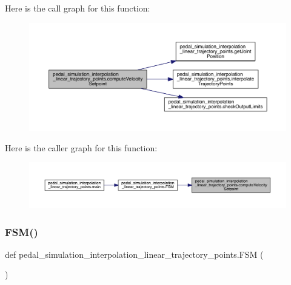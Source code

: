 Here is the call graph for this function\+:\nopagebreak
\begin{figure}[H]
\begin{center}
\leavevmode
\includegraphics[width=350pt]{namespacepedal__simulation__interpolation__linear__trajectory__points_acd7eb1865e5d89c44a0a4e799df6ff8f_cgraph}
\end{center}
\end{figure}
Here is the caller graph for this function\+:\nopagebreak
\begin{figure}[H]
\begin{center}
\leavevmode
\includegraphics[width=350pt]{namespacepedal__simulation__interpolation__linear__trajectory__points_acd7eb1865e5d89c44a0a4e799df6ff8f_icgraph}
\end{center}
\end{figure}
\mbox{\label{namespacepedal__simulation__interpolation__linear__trajectory__points_aa9b9e1956f51882e5f93d5f2bc0fd29b}} 
\subsubsection{\texorpdfstring{FSM()}{FSM()}}
{\footnotesize\ttfamily def pedal\+\_\+simulation\+\_\+interpolation\+\_\+linear\+\_\+trajectory\+\_\+points.\+F\+SM (\begin{DoxyParamCaption}{ }\end{DoxyParamCaption})}




